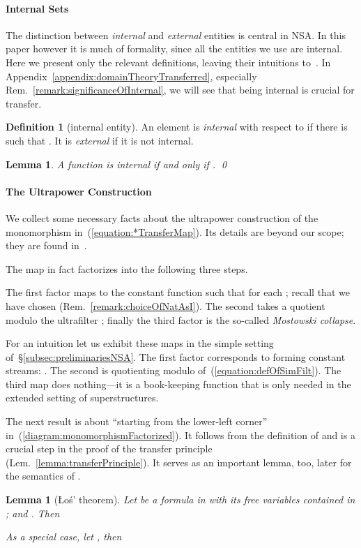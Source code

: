 \documentclass[envcountsect,orivec]{llncs} \pdfoutput=1
\newtheorem{mylem}[mythm]{Lemma}
\theoremstyle{definition}
\newtheorem{mydef}[mythm]{Definition}
\def\myqed{\qed}
\begin{document}
\paragraph{Internal Sets}
The distinction between \emph{internal} and \emph{external} entities is
central in NSA.  In this paper however it is much of formality, since
all the entities we use are internal.  Here we present only the relevant
definitions, leaving their intuitions to~\cite[\S{}II.6]{Hurd1985}.
In Appendix~\ref{appendix:domainTheoryTransferred}, 
 especially
 Rem.~\ref{remark:significanceOfInternal}, we will see that being
 internal is
  crucial 
 for transfer.

\begin{mydef}[internal entity]\label{definition:internalEntity}
 An element  is \emph{internal} with respect to
  if there is  such
 that . It is \emph{external} if it is not internal.
\end{mydef}

\begin{mylem}\label{lemma:charInternalFunction}
A function  is internal if and only if
 . \myqed
\end{mylem}


\paragraph{The Ultrapower Construction}
We collect some necessary facts about
the ultrapower construction of the monomorphism 
in~(\ref{equation:*TransferMap}). Its details are beyond our scope; they 
are found in~\cite[\S{}II.4]{Hurd1985}.

The map   in fact factorizes into the following three
steps.

The first factor  maps  to the constant
function  such that  for each ;
recall that we have chosen  (Rem.~\ref{remark:choiceOfNatAsI}). The second
  takes a quotient modulo the ultrafilter ;
finally the third factor  is the so-called \emph{Mostowski collapse}.

For an intuition let us exhibit these maps in the simple setting of~\S{}\ref{subsec:preliminariesNSA}.
The first factor   corresponds to forming constant streams:
. The second  is quotienting
modulo  of~(\ref{equation:defOfSimFilt}). The third map
 does nothing---it is a book-keeping function
that is only needed in the extended setting of superstructures.

The next result \cite[Thm.~4.5]{Hurd1985} is about ``starting from the lower-left corner'' in~(\ref{diagram:monomorphismFactorized}). It
follows from the definition of  and  is a crucial
step in the proof of the transfer principle (Lem.~\ref{lemma:transferPrinciple}). It serves as an important
lemma, too,  later for
the semantics of .
\begin{mylem}[\L{}o\'{s}' theorem]\label{lemma:sequenceAsHyperEntity}
Let  be a formula in  with its free variables contained in ; and . Then
 
 As a special case, let , then

\end{mylem}
\end{document}

